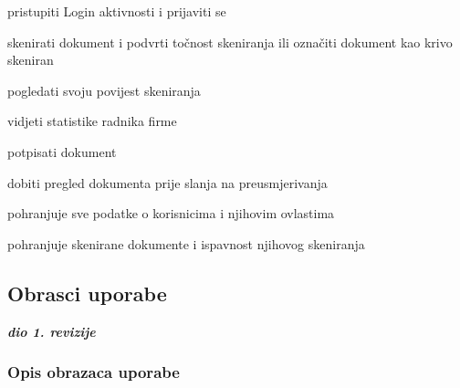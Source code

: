 \begin{packed_enum}
\begin{packed_enum}
			
			
		\end{packed_enum}
		
		\item  {}
		
		\begin{packed_enum}
			
			\item pristupiti Login aktivnosti i prijaviti se
			\item skenirati dokument i podvrti točnost skeniranja ili označiti dokument kao krivo skeniran
			\item pogledati svoju povijest skeniranja
			\item vidjeti statistike radnika firme
			\item potpisati dokument
			\item dobiti pregled dokumenta prije slanja na preusmjerivanja
			
		\end{packed_enum}
		\item  {}
		
		\begin{packed_enum}
			
			\item pohranjuje sve podatke o korisnicima i njihovim ovlastima
			\item pohranjuje skenirane dokumente i ispavnost njihovog skeniranja
			
			
		\end{packed_enum}
		
		
	\end{packed_enum}
	
	\eject 
	
	
	
	\subsection{Obrasci uporabe}
	
	\textbf{\textit{dio 1. revizije}}
	
	\subsubsection{Opis obrazaca uporabe}

	
	
